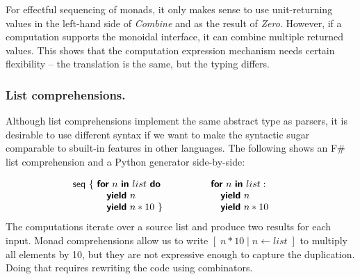\documentclass[runningheads,a4paper]{llncs}
\begin{document}
For effectful sequencing of monads, it only makes sense to use unit-returning values in the left-hand
side of \emph{Combine} and as the result of \emph{Zero}. However, if a computation supports the monoidal
interface, it can combine multiple returned values. This shows that the computation 
expression mechanism needs certain flexibility -- the translation is the same, but the typing differs.

\subsubsection{List comprehensions.} Although list comprehensions implement the same abstract type
as parsers, it is desirable to use different syntax if we want to make the syntactic sugar comparable to 
sbuilt-in features in other languages. The following shows an F\# list comprehension and a Python generator
side-by-side:

\begin{equation*}
\hspace{-2em}
\begin{array}{l}
\ident{seq}~\{~ \kvd{for}~n~\kvd{in}~list~\kvd{do}  \\
\hspace{3.5em}  \kvd{yield}~n          \\
\hspace{3.5em}  \kvd{yield}~n*10 ~\}
\end{array}
\qquad\qquad
\begin{array}{l}
\kvd{for}~n~\kvd{in}~list:  \\
\quad \kvd{yield}~n          \\
\quad \kvd{yield}~n*10
\end{array}
\end{equation*}
%
The computations iterate over a source list and produce two results for each input. 
Monad comprehensions \cite{monad-compre} allow us to write $[\;n*10\;|\;n\leftarrow list\;]$
to multiply all elements by 10, but they are not expressive enough to capture the duplication. 
Doing that requires rewriting the code using combinators.
\end{document}
